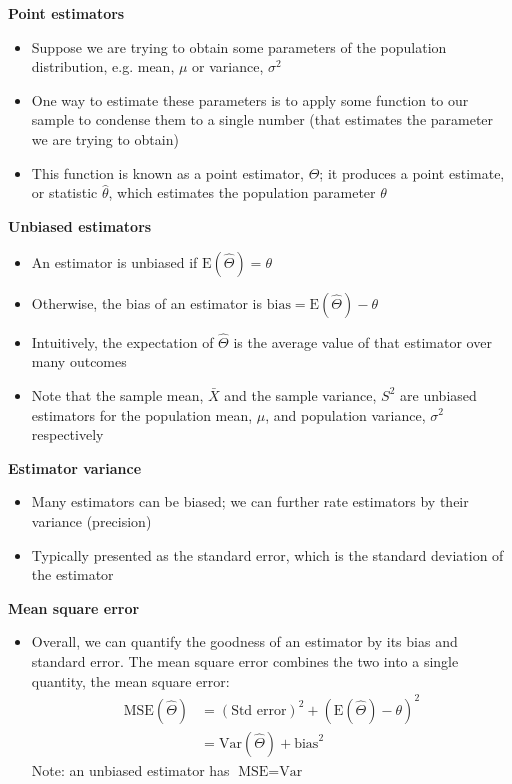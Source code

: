 \documentclass[a4paper]{article}
\newcommand{\heading}[1]{{\small\textbf{#1}}}
\newcommand{\subheading}[1]{{\scriptsize\textbf{#1}}}
\begin{document}
\begin{multicols*}{4}
\heading{Point estimators}
\begin{itemize} \itemsep -0.5em
    \item Suppose we are trying to obtain some parameters of the
        population distribution, e.g. mean, $\mu$ or variance, 
        $\sigma^2$
    \item One way to estimate these parameters is to apply some function
        to our sample to condense them to a single number (that
        estimates the parameter we are trying to obtain)
    \item This function is known as a point estimator, $\hat\Theta$; it
        produces a point estimate, or statistic $\hat\theta$, which
        estimates the population parameter $\theta$
\end{itemize}
\subheading{Unbiased estimators}
\begin{itemize} \itemsep -0.5em
    \item An estimator is unbiased if 
        $ \mathrm{E}(\hat\Theta) = \theta $
    \item Otherwise, the bias of an estimator is
        $ \mathrm{bias} = \mathrm{E}(\hat\Theta) - \theta$
    \item Intuitively, the expectation of $\hat\Theta$ is the average
        value of that estimator over many outcomes
    \item Note that the sample mean, $\bar{X}$ and the sample variance,
        $S^2$ are unbiased estimators for the population mean, $\mu$,
        and population variance, $\sigma^2$ respectively
\end{itemize}
\subheading{Estimator variance}
\begin{itemize} \itemsep -0.5em
    \item Many estimators can be biased; we can further rate estimators
        by their variance (precision)
    \item Typically presented as the standard error, which is the
        standard deviation of the estimator
\end{itemize}
\subheading{Mean square error}
\begin{itemize} \itemsep -0.5em
    \item Overall, we can quantify the goodness of an estimator by its
        bias and standard error. The mean square error combines the two
        into a single quantity, the mean square error:
        \begin{align*}
            \mathrm{MSE}(\hat\Theta) 
                &= (\text{Std error})^2 +
                   (\mathrm{E}(\hat\Theta) - \theta)^2 \\
                &= \text{Var}(\hat\Theta) + \text{bias}^2
        \end{align*}
        Note: an unbiased estimator has $\text{MSE} = \text{Var}$
\end{itemize}


\end{multicols*}
\end{document}
